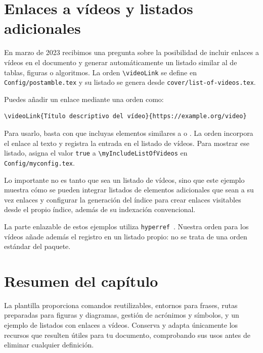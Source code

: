 \section{Enlaces a vídeos y listados adicionales}
\label{sec:intro-videolink}

En marzo de 2023 recibimos una pregunta sobre la posibilidad de incluir enlaces a vídeos en el documento y generar automáticamente un listado similar al de tablas, figuras o algoritmos. La orden \texttt{\textbackslash{}videoLink} se define en \texttt{Config/postamble.tex} y su listado se genera desde \texttt{cover/list-of-videos.tex}.

Puedes añadir un enlace mediante una orden como:

\begin{verbatim}
\videoLink{Título descriptivo del vídeo}{https://example.org/video}
\end{verbatim}

Para usarlo, basta con que incluyas elementos similares a  o . La orden incorpora el enlace al texto y registra la entrada en el listado de vídeos. Para mostrar ese listado, asigna el valor \texttt{true} a \texttt{\textbackslash{}myIncludeListOfVideos} en \texttt{Config/myconfig.tex}.

Lo importante no es tanto que sea un listado de vídeos, sino que este ejemplo muestra cómo se pueden integrar listados de elementos adicionales que sean a su vez enlaces y configurar la generación del índice para crear enlaces visitables desde el propio índice, además de su indexación convencional.

La parte enlazable de estos ejemplos utiliza \texttt{hyperref}~\cite{hyperref-manual}. Nuestra orden para los vídeos añade además el registro en un listado propio: no se trata de una orden estándar del paquete.

\section{Resumen del capítulo}
\label{sec:resumen-elementos-utilidad}

La plantilla proporciona comandos reutilizables, entornos para frases, rutas preparadas para figuras y diagramas, gestión de acrónimos y símbolos, y un ejemplo de listados con enlaces a vídeos. Conserva y adapta únicamente los recursos que resulten útiles para tu documento, comprobando sus usos antes de eliminar cualquier definición.

